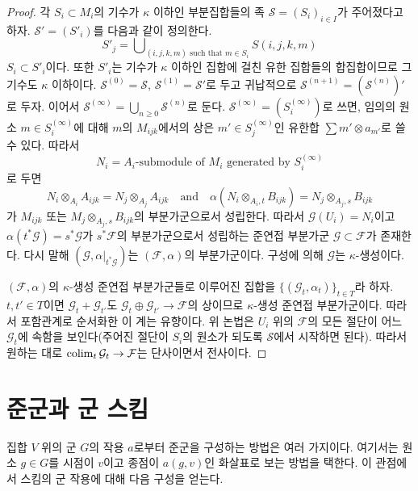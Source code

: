 \begin{proof}
\medskip\noindent
각 $S_i \subset M_i$의 기수가 $\kappa$ 이하인 부분집합들의 족 $\mathcal{S} = (S_i)_{i \in I}$가 주어졌다고 하자.
$\mathcal{S}' = (S'_i)$를 다음과 같이 정의한다.
$$
S'_j = \bigcup\nolimits_{(i, j, k, m)\text{ such that }m \in S_i}
S(i, j, k, m)
$$
$S_i \subset S'_i$이다. 또한 $S'_i$는 기수가 $\kappa$ 이하인 집합에 걸친 유한 집합들의 합집합이므로
그 기수도 $\kappa$ 이하이다. $\mathcal{S}^{(0)} = \mathcal{S}$, $\mathcal{S}^{(1)} = \mathcal{S}'$로 두고 귀납적으로
$\mathcal{S}^{(n + 1)} = (\mathcal{S}^{(n)})'$로 두자. 이어서
$\mathcal{S}^{(\infty)} = \bigcup_{n \geq 0} \mathcal{S}^{(n)}$로 둔다.
$\mathcal{S}^{(\infty)} = (S^{(\infty)}_i)$로 쓰면, 임의의 원소 $m \in S^{(\infty)}_i$에 대해 $m$의 $M_{ijk}$에서의 상은
$m' \in S_j^{(\infty)}$인 유한합 $\sum m' \otimes a_{m'}$로 쓸 수 있다. 따라서
$$
N_i = A_i\text{-submodule of }M_i\text{ generated by }S^{(\infty)}_i
$$
로 두면
$$
N_i \otimes_{A_i} A_{ijk} = N_j \otimes_{A_j} A_{ijk}
\quad\text{and}\quad
\alpha(N_i \otimes_{A_i, t} B_{ijk}) = N_j \otimes_{A_j, s} B_{ijk}
$$
가 $M_{ijk}$ 또는 $M_j \otimes_{A_j, s} B_{ijk}$의 부분가군으로서 성립한다. 따라서
$\mathcal{G}(U_i) = N_i$이고 $\alpha(t^*\mathcal{G}) = s^*\mathcal{G}$가 $s^*\mathcal{F}$의 부분가군으로서
성립하는 준연접 부분가군 $\mathcal{G} \subset \mathcal{F}$가 존재한다. 다시 말해
$(\mathcal{G}, \alpha|_{t^*\mathcal{G}})$는 $(\mathcal{F}, \alpha)$의 부분가군이다. 구성에 의해
$\mathcal{G}$는 $\kappa$-생성이다.

\medskip\noindent
$(\mathcal{F}, \alpha)$의 $\kappa$-생성 준연접 부분가군들로 이루어진 집합을
$\{(\mathcal{G}_t, \alpha_t)\}_{t \in T}$라 하자. $t, t' \in T$이면
$\mathcal{G}_t + \mathcal{G}_{t'}$도 $\mathcal{G}_t \oplus \mathcal{G}_{t'} \to \mathcal{F}$의 상이므로
$\kappa$-생성 준연접 부분가군이다. 따라서 포함관계로 순서화한 이 계는 유향이다. 위 논법은 $U_i$ 위의
$\mathcal{F}$의 모든 절단이 어느 $\mathcal{G}_t$에 속함을 보인다(주어진 절단이 $S_i$의 원소가 되도록
$\mathcal{S}$에서 시작하면 된다). 따라서 원하는 대로 $\mathop{\mathrm{colim}}\nolimits_t \mathcal{G}_t \to \mathcal{F}$는 단사이면서 전사이다.
\end{proof}





\section{준군과 군 스킴}
\label{section-groupoids-group-schemes}

\noindent
집합 $V$ 위의 군 $G$의 작용 $a$로부터 준군을 구성하는 방법은 여러 가지이다. 여기서는 원소 $g \in G$를
시점이 $v$이고 종점이 $a(g, v)$인 화살표로 보는 방법을 택한다. 이 관점에서 스킴의 군 작용에 대해 다음 구성을 얻는다.

